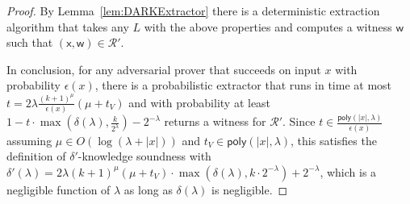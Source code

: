\begin{proof}
By Lemma~\ref{lem:DARKExtractor} there is a deterministic extraction algorithm that takes any $L$ with the above properties and computes a witness $\mathsf{w}$ such that $(\mathsf{x}, \mathsf{w}) \in \mathcal{R}'$. 

\medskip 

In conclusion, for any adversarial prover that succeeds on input $x$ with probability $\epsilon(x)$, there is a probabilistic extractor that runs in time at most $t = 2\lambda \frac{(k+1)^\mu}{\epsilon(x)} (\mu + t_V)$ and with probability at least $1 - t \cdot \max(\delta(\lambda), \frac{k}{2^\lambda}) - 2^{-\lambda}$ returns a witness for $\mathcal{R}'$. Since $t \in \frac{\textsf{poly}(|x|, \lambda)}{\epsilon(x)}$ assuming $\mu \in O(\log(\lambda + |x|))$ and $t_V \in \textsf{poly}(|x|, \lambda)$, this satisfies the definition of $\delta'$-knowledge soundness with $\delta'(\lambda) = 2\lambda (k+1)^\mu (\mu + t_V) \cdot \max(\delta(\lambda), k \cdot 2^{-\lambda}) + 2^{-\lambda}$, which is a negligible function of $\lambda$ as long as $\delta(\lambda)$ is negligible. 


\end{proof} 

